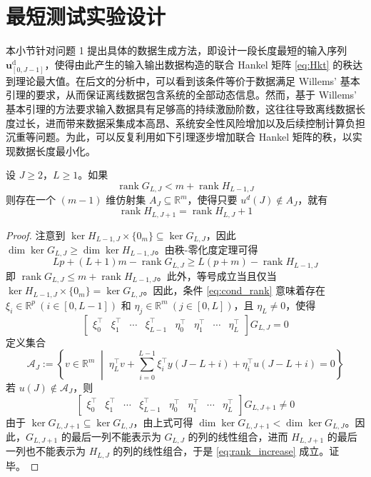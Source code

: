 \section{最短测试实验设计}
\label{sec:shortest}

本小节针对问题 1 提出具体的数据生成方法，即设计一段长度最短的输入序列 \(\mathbf{u}^{\mathrm{d}}_{[0,J-1]}\)，使得由此产生的输入输出数据构造的联合 Hankel 矩阵 \eqref{eq:Hkt} 的秩达到理论最大值。在后文的分析中，可以看到该条件等价于数据满足 Willems' 基本引理的要求，从而保证离线数据包含系统的全部动态信息。然而，基于 Willems' 基本引理的方法要求输入数据具有足够高的持续激励阶数，这往往导致离线数据长度过长，进而带来数据采集成本高昂、系统安全性风险增加以及后续控制计算负担沉重等问题。为此，可以反复利用如下引理逐步增加联合 Hankel 矩阵的秩，以实现数据长度最小化。

\begin{lemma}[最短测试实验]
	设 \(J \geq 2\)，\(L \geq 1\)。如果
	\begin{equation}
		\operatorname{rank} G_{L,J} < m + \operatorname{rank} H_{L-1,J}
		\label{eq:cond_rank}
	\end{equation}
	则存在一个 \((m-1)\) 维仿射集 \(A_J \subseteq \mathbb{R}^m\)，使得只要 \(u^d(J) \notin A_J\)，就有
	\begin{equation}
		\operatorname{rank} H_{L,J+1} = \operatorname{rank} H_{L,J} + 1
		\label{eq:rank_increase}
	\end{equation}
	\label{lem:shortest}
\end{lemma}

\begin{proof}
	注意到 \(\ker H_{L-1,J} \times \{0_m\} \subseteq \ker G_{L,J}\)，因此 \(\dim \ker G_{L,J} \geq \dim \ker H_{L-1,J}\)。由秩-零化度定理可得
	\[
	{L}p + (L+1)m - \operatorname{rank} G_{L,J} \geq L(p+m) - \operatorname{rank} H_{L-1,J}
	\]
	即 \(\operatorname{rank} G_{L,J} \leq m + \operatorname{rank} H_{L-1,J}\)。此外，等号成立当且仅当 \(\ker H_{L-1,J} \times \{0_m\} = \ker G_{L,J}\)。因此，条件 \eqref{eq:cond_rank} 意味着存在 \(\xi_i \in \mathbb{R}^p\ (i \in [0,L-1])\) 和 \(\eta_j \in \mathbb{R}^m\ (j \in [0,L])\)，且 \(\eta_L \neq 0\)，使得
	\[
	\begin{bmatrix}
		\xi_0^\top & \xi_1^\top & \cdots & \xi_{L-1}^\top & \eta_0^\top & \eta_1^\top & \cdots & \eta_L^\top
	\end{bmatrix}
	G_{L,J} = 0
	\]
	定义集合
	\[
	\mathcal{A}_J := \left\{ v \in \mathbb{R}^m \;\middle|\; \eta_L^\top v + \sum_{i=0}^{L-1} \xi_i^\top y(J-L+i) + \eta_i^\top u(J-L+i) = 0 \right\}
	\]
	若 \(u(J) \notin \mathcal{A}_J\)，则
	\[
	\begin{bmatrix}
		\xi_0^\top & \xi_1^\top & \cdots & \xi_{L-1}^\top & \eta_0^\top & \eta_1^\top & \cdots & \eta_L^\top
	\end{bmatrix}
	G_{L,J+1} \neq 0
	\]
	由于 \(\ker G_{L,J+1} \subseteq \ker G_{L,J}\)，由上式可得 \(\dim \ker G_{L,J+1} < \dim \ker G_{L,J}\)。因此，\(G_{L,J+1}\) 的最后一列不能表示为 \(G_{L,J}\) 的列的线性组合，进而 \(H_{L,J+1}\) 的最后一列也不能表示为 \(H_{L,J}\) 的列的线性组合，于是 \eqref{eq:rank_increase} 成立。证毕。
\end{proof}

